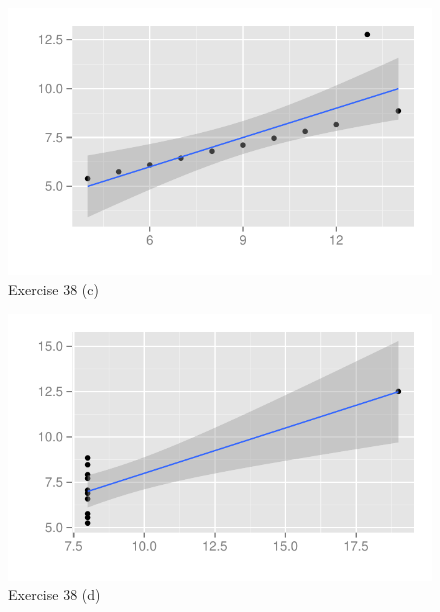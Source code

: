 \documentclass[letterpaper, landscape]{exam}
\begin{document}
\begin{description}
        \begin{figure}[H]
          \centering
          \includegraphics[scale = 0.9]{figures/ex38c.pdf}
          \caption{Exercise 38 (c)}
          \label{fig:38c}
        \end{figure}

        \begin{figure}[H]
          \centering
          \includegraphics[scale = 0.9]{figures/ex38d.pdf}
          \caption{Exercise 38 (d)}
          \label{fig:38d}
        \end{figure}

\end{description}
\end{document}
